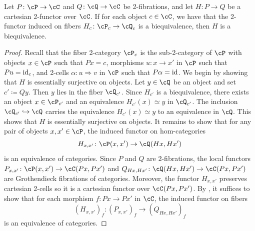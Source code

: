 \documentclass[11pt, dvipsnames]{amsart}
\begin{document}
\begin{prop}\label{bieq.on.fibers}
    Let $P\colon\cP\to \cC$ and $Q\colon \cQ\to\cC$ be 2-fibrations, and let $H\colon P\to Q$ be a cartesian 2-functor over $\cC$. If for each object $c\in\cC$, we have that the 2-functor induced on fibers $H_c\colon \cP_c\to \cQ_c$ is a biequivalence, then $H$ is a biequivalence. 
\end{prop}
\begin{proof}
Recall that the fiber 2-category $\cP_c$ is the sub-2-category of $\cP$ with objects $x\in\cP$ such that $Px=c$, morphisms $u\colon x\to x'$ in $\cP$ such that $Pu=\mathrm{id}_c$, and 2-cells $\alpha\colon u\Rightarrow v$ in $\cP$ such that $P\alpha=\mathrm{id}$. We begin by showing that $H$ is essentially surjective on objects. Let $y \in \cQ$ be an object and set $c' \coloneqq Qy$. Then $y$ lies in the fiber $\cQ_{c'}$. Since $H_{c'}$ is a biequivalence, there exists an object $x \in \cP_{c'}$ and an equivalence $H_{c'}(x)\simeq y$ in $\cQ_{c'}$. The inclusion $\cQ_{c'} \hookrightarrow \cQ$ carries the equivalence $H_{c'}(x) \simeq y$ to an equivalence in $\cQ$. This shows that $H$ is essentially surjective on objects. It remains to show that for any pair of objects $x,x' \in \cP$, the induced functor on hom-categories
\[
H_{x,x'}\colon \cP(x,x') \to \cQ(Hx,Hx')
\]
is an equivalence of categories. 
Since $P$ and $Q$ are $2$-fibrations, the local functors $P_{x,x'}\colon \cP(x,x') \to \cC(Px,Px')$ and $Q_{Hx,Hx'}\colon \cQ(Hx,Hx') \to \cC(Px,Px')$ are Grothendieck fibrations of categories. Moreover, the functor $H_{x,x'}$ preserves cartesian 2-cells so it is a cartesian functor over $\cC(Px,Px')$. By \cite[\nopp Proposition 3.36]{vistoli2007notesgrothendiecktopologiesfibered}, it suffices to show that for each morphism $f\colon Px\to Px'$ in $\cC$, the induced functor on fibers
\[
(H_{x,x'})_f\colon (P_{x,x'})_f \to (Q_{Hx,Hx'})_f
\] 
is an equivalence of categories. 


\end{proof}
\end{document}
